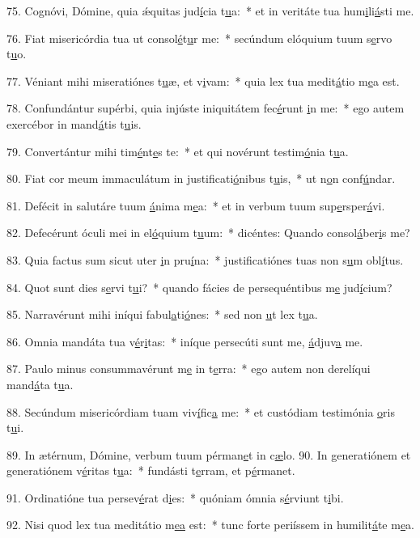 75. Cognóvi, Dómine, quia ǽquitas jud\uline{í}cia t\uline{u}a:~* et in veritáte tua hum\uline{i}li\uline{á}sti me.\par 
76. Fiat misericórdia tua ut consol\uline{é}t\uline{u}r me:~* secúndum elóquium tuum s\uline{e}rvo t\uline{u}o.\par 
77. Véniant mihi miseratiónes t\uline{u}æ, et v\uline{i}vam:~* quia lex tua medit\uline{á}tio m\uline{e}a est.\par 
78. Confundántur supérbi, quia injúste iniquitátem fec\uline{é}runt \uline{i}n me:~* ego autem exercébor in mand\uline{á}tis t\uline{u}is.\par 
79. Convertántur mihi tim\uline{é}nt\uline{e}s te:~* et qui novérunt testim\uline{ó}nia t\uline{u}a.\par 
80. Fiat cor meum immaculátum in justificati\uline{ó}nibus t\uline{u}is,~* ut n\uline{o}n conf\uline{ú}ndar.\par 
81. Defécit in salutáre tuum \uline{á}nima m\uline{e}a:~* et in verbum tuum sup\uline{e}rsper\uline{á}vi.\par 
82. Defecérunt óculi mei in el\uline{ó}quium t\uline{u}um:~* dicéntes: Quando consol\uline{á}ber\uline{i}s me?\par 
83. Quia factus sum sicut uter \uline{i}n pru\uline{í}na:~* justificatiónes tuas non s\uline{u}m obl\uline{í}tus.\par 
84. Quot sunt dies s\uline{e}rvi t\uline{u}i?~* quando fácies de persequéntibus m\uline{e} jud\uline{í}cium?\par 
85. Narravérunt mihi iníqui fabul\uline{a}ti\uline{ó}nes:~* sed non \uline{u}t lex t\uline{u}a.\par 
86. Omnia mandáta tua v\uline{é}r\uline{i}tas:~* iníque persecúti sunt me, \uline{á}djuv\uline{a} me.\par 
87. Paulo minus consummavérunt m\uline{e} in t\uline{e}rra:~* ego autem non derelíqui mand\uline{á}ta t\uline{u}a.\par 
88. Secúndum misericórdiam tuam viv\uline{í}fic\uline{a} me:~* et custódiam testimónia \uline{o}ris t\uline{u}i.\par 
89. In ætérnum, Dómine, verbum tuum pérman\uline{e}t in c\uline{æ}lo.
90. In generatiónem et generatiónem v\uline{é}ritas t\uline{u}a:~* fundásti t\uline{e}rram, et p\uline{é}rmanet.\par 
91. Ordinatióne tua persev\uline{é}rat d\uline{i}es:~* quóniam ómnia s\uline{é}rviunt t\uline{i}bi.\par 
92. Nisi quod lex tua meditátio m\uline{e}\uline{a} est:~* tunc forte periíssem in humilit\uline{á}te m\uline{e}a.\par 
